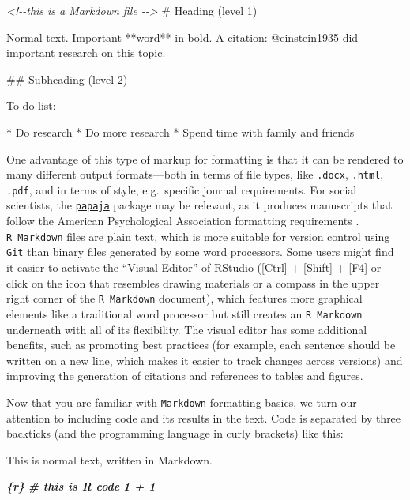 \documentclass[psych,tutorial,submit,moreauthors,pdftex]{mdpi}
\newenvironment{Shaded}{\begin{snugshade}}{\end{snugshade}}
\newcommand{\CommentTok}[1]{\textcolor[rgb]{0.56,0.35,0.01}{\textit{#1}}}
\newcommand{\FunctionTok}[1]{\textcolor[rgb]{0.00,0.00,0.00}{#1}}
\newcommand{\InformationTok}[1]{\textcolor[rgb]{0.56,0.35,0.01}{\textbf{\textit{#1}}}}
\newcommand{\NormalTok}[1]{#1}
\newcommand{\SpecialStringTok}[1]{\textcolor[rgb]{0.31,0.60,0.02}{#1}}
\begin{document}
\begin{Shaded}
\begin{Highlighting}[]
\CommentTok{\textless{}!{-}{-}this is a Markdown file {-}{-}\textgreater{}}
\FunctionTok{\# Heading (level 1)}

\NormalTok{Normal text.}
\NormalTok{Important **word** in bold.}
\NormalTok{A citation: @einstein1935 did important research on this topic.}

\FunctionTok{\#\# Subheading (level 2)}

\NormalTok{To do list:}

\SpecialStringTok{* }\NormalTok{Do research}
\SpecialStringTok{* }\NormalTok{Do more research}
\SpecialStringTok{* }\NormalTok{Spend time with family and friends}
\end{Highlighting}
\end{Shaded}

One advantage of this type of markup for formatting is that it can be
rendered to many different output formats---both in terms of file types,
like \texttt{.docx}, \texttt{.html}, \texttt{.pdf}, and in terms of
style, e.g.~specific journal requirements. For social scientists, the
\href{https://github.com/crsh/papaja}{\texttt{papaja}} package
\citep{papaja} may be relevant, as it produces manuscripts that follow
the American Psychological Association formatting requirements
\citep{apa7}. \texttt{R\ Markdown} files are plain text, which is more
suitable for version control using \texttt{Git} than binary files
generated by some word processors. Some users might find it easier to
activate the ``Visual Editor'' of RStudio ({[}Ctrl{]} + {[}Shift{]} +
{[}F4{]} or click on the icon that resembles drawing materials or a
compass in the upper right corner of the \texttt{R\ Markdown} document),
which features more graphical elements like a traditional word processor
but still creates an \texttt{R\ Markdown} underneath with all of its
flexibility. The visual editor has some additional benefits, such as
promoting best practices (for example, each sentence should be written
on a new line, which makes it easier to track changes across versions)
and improving the generation of citations and references to tables and
figures.

Now that you are familiar with \texttt{Markdown} formatting basics, we
turn our attention to including code and its results in the text. Code
is separated by three backticks (and the programming language in curly
brackets) like this:

\begin{Shaded}
\begin{Highlighting}[]
\NormalTok{This is normal text, written in Markdown.}

\InformationTok{\textasciigrave{}\textasciigrave{}\textasciigrave{}\{r\}}
\InformationTok{\# this is R code}
\InformationTok{1 + 1}
\InformationTok{\textasciigrave{}\textasciigrave{}\textasciigrave{}}
\end{Highlighting}
\end{Shaded}
\end{document}
